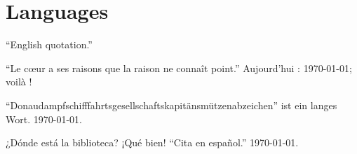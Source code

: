 \documentclass[a5paper]{article}
\begin{document}
\section{Languages}
\enquote{English quotation.}
\begin{french}
\enquote{Le cœur a ses raisons que la raison ne connaît point.} Aujourd'hui : \today ; voilà !
\end{french}
\begin{german}
\enquote{Donaudampfschifffahrtsgesellschaftskapitänsmützenabzeichen} ist ein langes Wort. \today.
\end{german}
\begin{spanish}
¿Dónde está la biblioteca? ¡Qué bien! \enquote{Cita en español.} \today.
\end{spanish}
\end{document}
